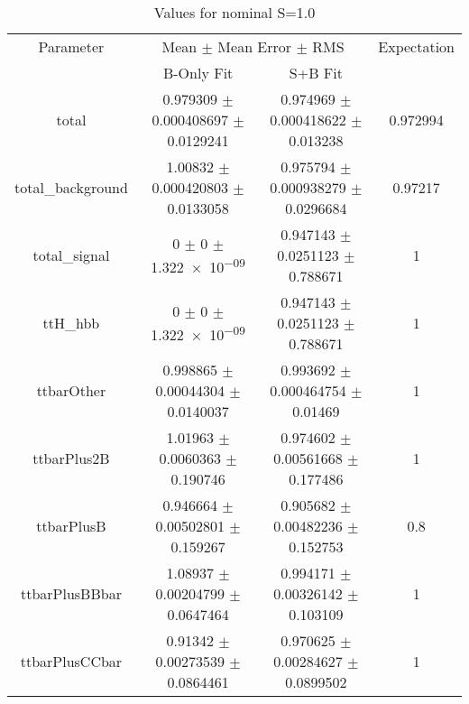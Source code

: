 \begin{table}
\centering
\caption{Values for nominal S=1.0}
\begin{tabular}{cccc}
\toprule
Parameter & \multicolumn{2}{c}{Mean $\pm$ Mean Error $\pm$ RMS} & Expectation\\
 & B-Only Fit & S+B Fit & \\
\midrule
total & \num{0.979309} $\pm$ \num{0.000408697} $\pm$ \num{0.0129241} & \num{0.974969} $\pm$ \num{0.000418622} $\pm$ \num{0.013238} & \num{0.972994}\\
total\_background & \num{1.00832} $\pm$ \num{0.000420803} $\pm$ \num{0.0133058} & \num{0.975794} $\pm$ \num{0.000938279} $\pm$ \num{0.0296684} & \num{0.97217}\\
total\_signal & \num{0} $\pm$ \num{0} $\pm$ \num{1.322e-09} & \num{0.947143} $\pm$ \num{0.0251123} $\pm$ \num{0.788671} & \num{1}\\
ttH\_hbb & \num{0} $\pm$ \num{0} $\pm$ \num{1.322e-09} & \num{0.947143} $\pm$ \num{0.0251123} $\pm$ \num{0.788671} & \num{1}\\
ttbarOther & \num{0.998865} $\pm$ \num{0.00044304} $\pm$ \num{0.0140037} & \num{0.993692} $\pm$ \num{0.000464754} $\pm$ \num{0.01469} & \num{1}\\
ttbarPlus2B & \num{1.01963} $\pm$ \num{0.0060363} $\pm$ \num{0.190746} & \num{0.974602} $\pm$ \num{0.00561668} $\pm$ \num{0.177486} & \num{1}\\
ttbarPlusB & \num{0.946664} $\pm$ \num{0.00502801} $\pm$ \num{0.159267} & \num{0.905682} $\pm$ \num{0.00482236} $\pm$ \num{0.152753} & \num{0.8}\\
ttbarPlusBBbar & \num{1.08937} $\pm$ \num{0.00204799} $\pm$ \num{0.0647464} & \num{0.994171} $\pm$ \num{0.00326142} $\pm$ \num{0.103109} & \num{1}\\
ttbarPlusCCbar & \num{0.91342} $\pm$ \num{0.00273539} $\pm$ \num{0.0864461} & \num{0.970625} $\pm$ \num{0.00284627} $\pm$ \num{0.0899502} & \num{1}\\
\bottomrule
\end{tabular}
\end{table}